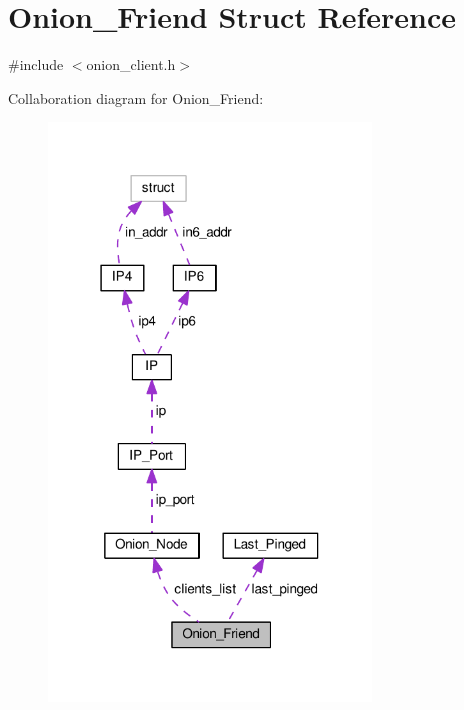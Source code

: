 \hypertarget{struct_onion___friend}{\section{Onion\+\_\+\+Friend Struct Reference}
\label{struct_onion___friend}
}


{\ttfamily \#include $<$onion\+\_\+client.\+h$>$}



Collaboration diagram for Onion\+\_\+\+Friend\+:
\nopagebreak
\begin{figure}[H]
\begin{center}
\leavevmode
\includegraphics[width=243pt]{d2/da0/struct_onion___friend__coll__graph}
\end{center}
\end{figure}
